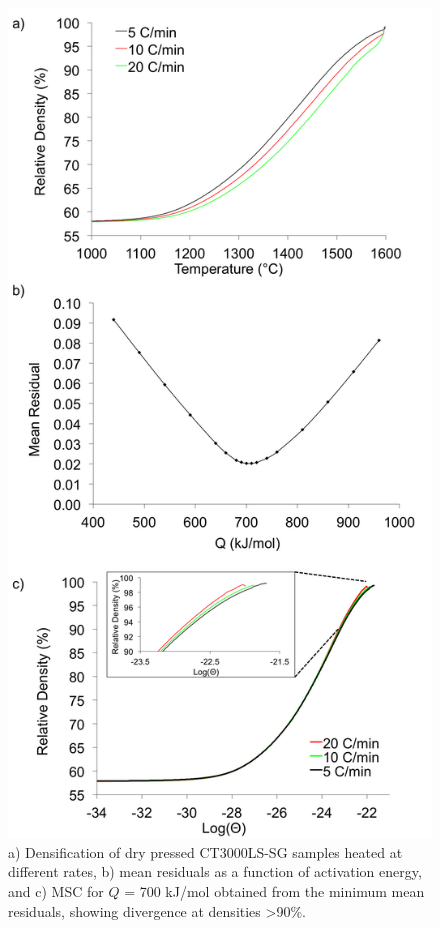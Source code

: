 \newpage
\begin{figure}[H]
	\centering
	\includegraphics[width=\textwidth]{Chapter-6/Figures/Figure8.png}
	\caption{a) Densification of dry pressed CT3000LS-SG samples heated at different rates, b) mean residuals as a function of activation energy, and c) MSC for $Q$ = 700 kJ/mol obtained from the minimum mean residuals, showing divergence at densities >90\%. }
	\label{Ch6-figure:Figure8}
\end{figure}

